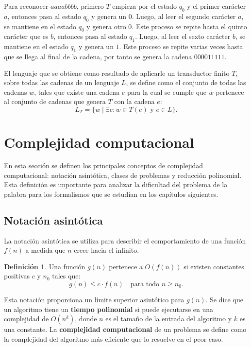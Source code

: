 \documentclass{report}
\theoremstyle{definition}
\newtheorem{definicion}{Definición}[chapter]
\theoremstyle{plain}
\theoremstyle{remark}
\begin{document}
Para reconocer $aaaabbbb$, primero $T$ empieza por el estado $q_0$ y el
primer carácter $a$, entonces pasa al estado $q_0$ y genera un $0$. Luego,
al leer el segundo carácter $a$, se mantiene en el estado $q_0$ y genera
otro $0$. Este proceso se repite hasta el quinto carácter que es $b$,
entonces pasa al estado $q_1$. Luego, al leer el sexto carácter $b$, se
mantiene en el estado $q_1$ y genera un $1$. Este proceso se repite
varias veces hasta que se llega al final de la cadena, por tanto se
genera la cadena $000011111$.

El lenguaje que se obtiene como resultado de aplicarle un transductor
finito $T$, sobre todas las cadenas de un lenguaje $L$, se define como el
conjunto de todas las cadenas $w$, tales que existe una cadena $e$ para
la cual se cumple que $w$ pertenece al conjunto de cadenas que genera $T$
con la cadena $e$:
\[
  L_T = \{ w \mid \exists e : w \in T(e) \text{ y } e \in L \}.
\]

\section{Complejidad computacional}
\label{sec:complejidad}

En esta sección se definen los principales conceptos de complejidad
computacional: notación asintótica, clases de problemas y reducción
polinomial. Esta definición es importante para analizar la dificultad del
problema de la palabra para los formalismos que se estudian en los
capítulos siguientes.

\subsection{Notación asintótica}

La notación asintótica se utiliza para describir el comportamiento de una
función $f(n)$ a medida que $n$ crece hacia el infinito.

\begin{definicion}
Una función $g(n)$ pertenece a $O(f(n))$ si existen constantes positivas
$c$ y $n_0$ tales que:
\[
  g(n) \le c \cdot f(n) \quad \text{para todo } n \ge n_0.
\]
\end{definicion}

Esta notación proporciona un límite superior asintótico para $g(n)$. Se
dice que un algoritmo tiene un \textbf{tiempo polinomial} si puede
ejecutarse en una complejidad de $O(n^k)$, donde $n$ es el tamaño de la
entrada del algoritmo y $k$ es una constante. La \textbf{complejidad
computacional} de un problema se define como la complejidad del algoritmo
más eficiente que lo resuelve en el peor caso.
\end{document}

